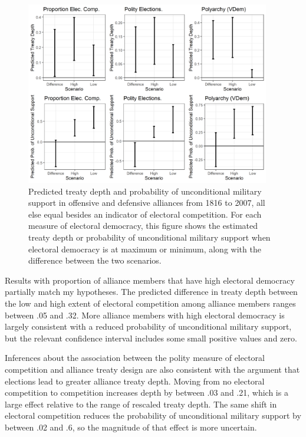 \documentclass[12pt]{article}
\begin{document}
\begin{figure}[hbtp]
\centering
\includegraphics[width=0.95\textwidth]{../figures/results-other-democ.png}
\caption{Predicted treaty depth and probability of unconditional military support in offensive and defensive alliances from 1816 to 2007, all else equal besides an indicator of electoral competition. For each measure of electoral democracy, this figure shows the estimated treaty depth or probability of unconditional military support when electoral democracy is at maximum or minimum, along with the difference between the two scenarios.}
\label{fig:results-other-democ}
\end{figure}


Results with proportion of alliance members that have high electoral democracy partially match my hypotheses.  
The predicted difference in treaty depth between the low and high extent of electoral competition among alliance members ranges between .05 and .32.
More alliance members with high electoral democracy is largely consistent with a reduced probability of unconditional military support, but the relevant confidence interval includes some small positive values and zero.  


Inferences about the association between the polity measure of electoral competition and alliance treaty design are also consistent with the argument that elections lead to greater alliance treaty depth.
Moving from no electoral competition to competition increases depth by between .03 and .21, which is a large effect relative to the range of rescaled treaty depth. 
The same shift in electoral competition reduces the probability of unconditional military support by between .02 and .6, so the magnitude of that effect is more uncertain.  
\end{document}
